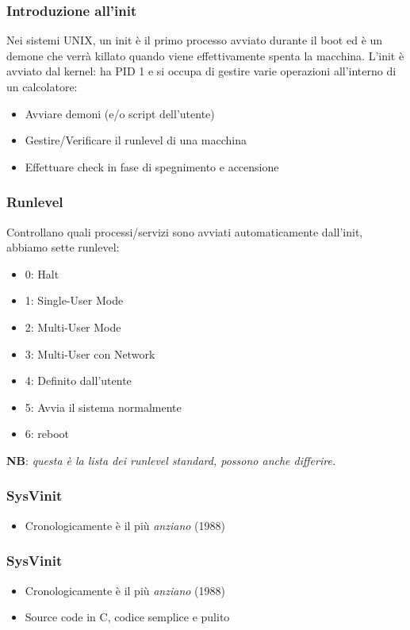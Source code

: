 \documentclass{beamer}
\begin{document}

\begin{frame}
	\frametitle{Introduzione all'init}
	Nei sistemi UNIX, un init \`e il primo processo avviato durante il boot ed \`e un demone che verr\`a killato quando viene effettivamente spenta la macchina. L'init \`e avviato dal kernel: ha PID 1 e si occupa di gestire varie operazioni all'interno di un calcolatore:
	\begin{itemize}
		\item Avviare demoni (e/o script dell'utente)
		\item Gestire/Verificare il runlevel di una macchina
		\item Effettuare check in fase di spegnimento e accensione \\
	\end{itemize}
\end{frame}




\begin{frame}
\frametitle{Runlevel}
Controllano quali processi/servizi sono avviati automaticamente dall'init, abbiamo sette runlevel:
\begin{itemize}
	\item 0: Halt
	\item 1: Single-User Mode
	\item 2: Multi-User Mode
	\item 3: Multi-User con Network
	\item 4: Definito dall'utente
	\item 5: Avvia il sistema normalmente
	\item 6: reboot
\end{itemize}

\textbf{NB}: \textit{questa \`e la lista dei runlevel standard, possono anche differire.}
\end{frame}

\begin{frame}
	\frametitle{SysVinit}
	\begin{itemize}
		\item Cronologicamente \`e il pi\`u \textit{anziano} (1988)
	\end{itemize}
\end{frame}

\begin{frame}
	\frametitle{SysVinit}
	\begin{itemize}
		\item Cronologicamente \`e il pi\`u \textit{anziano} (1988)
		\item Source code in C, codice semplice e pulito
	\end{itemize}
\end{frame}
\end{document}
